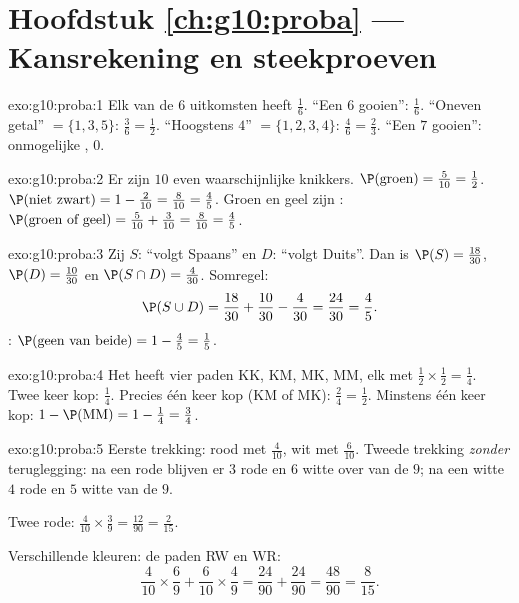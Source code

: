\section*{Hoofdstuk \ref{ch:g10:proba} --- Kansrekening en steekproeven}

\begin{solution}{exo:g10:proba:1}
Elk van de $6$ uitkomsten heeft  $\frac16$.
``Een $6$ gooien'': $\frac16$.
``Oneven getal'' $= \{1, 3, 5\}$: $\frac36 = \frac12$.
``Hoogstens $4$'' $= \{1,2,3,4\}$: $\frac46 = \frac23$.
``Een $7$ gooien'': onmogelijke ,  $0$.
\end{solution}

\begin{solution}{exo:g10:proba:2}
Er zijn $10$ even waarschijnlijke knikkers.
$\P(\text{groen}) = \frac{5}{10} = \frac12$.
$\P(\text{niet zwart}) = 1 - \frac{2}{10} = \frac{8}{10} = \frac45$.
Groen en geel zijn :
$\P(\text{groen of geel}) = \frac{5}{10} + \frac{3}{10} = \frac{8}{10}
= \frac45$.
\end{solution}

\begin{solution}{exo:g10:proba:3}
Zij $S$: ``volgt Spaans'' en $D$: ``volgt Duits''. Dan is
$\P(S) = \frac{18}{30}$, $\P(D) = \frac{10}{30}$ en
$\P(S \cap D) = \frac{4}{30}$. Somregel:
\[
\P(S \cup D) = \frac{18}{30} + \frac{10}{30} - \frac{4}{30}
= \frac{24}{30} = \frac45 .
\]
: $\P(\text{geen van beide}) = 1 - \frac45 = \frac15$.
\end{solution}

\begin{solution}{exo:g10:proba:4}
Het  heeft vier paden KK, KM, MK, MM, elk met 
$\frac12 \times \frac12 = \frac14$.
Twee keer kop: $\frac14$. Precies één keer kop (KM of MK):
$\frac24 = \frac12$. Minstens één keer kop:
$1 - \P(\text{MM}) = 1 - \frac14 = \frac34$.
\end{solution}

\begin{solution}{exo:g10:proba:5}
Eerste trekking: rood met  $\frac{4}{10}$, wit met  $\frac{6}{10}$.
Tweede trekking \emph{zonder} teruglegging: na een rode blijven er $3$ rode
en $6$ witte over van de $9$; na een witte $4$ rode en $5$ witte van de $9$.

Twee rode: $\frac{4}{10} \times \frac39 = \frac{12}{90} = \frac{2}{15}$.

Verschillende kleuren: de paden RW en WR:
\[
\frac{4}{10} \times \frac69 + \frac{6}{10} \times \frac49
= \frac{24}{90} + \frac{24}{90} = \frac{48}{90} = \frac{8}{15}.
\]
\end{solution}

